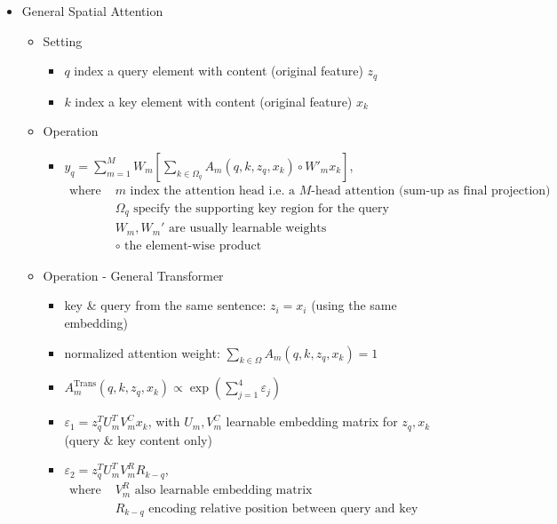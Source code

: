 \begin{itemize}
\item General Spatial Attention
	\begin{itemize}
	\item Setting
		\begin{itemize}
		\item $q$ index a query element with content (original feature) $z_q$
		\item $k$ index a key element with content (original feature) $x_k$
		\end{itemize}
	\item Operation
		\begin{itemize}
		\item $\displaystyle y_q=\sum_{m=1}^M W_m [ \sum_{k\in\Omega_q} A_m(q, k, z_q, x_k) \circ W'_m x_k ]$, \\
		$\begin{alignedat}{1}
		\text{where } & m \text{ index the attention head i.e. a } M\text{-head attention (sum-up as final projection)} \\
		& \Omega_q \text{ specify the supporting key region for the query} \\
		& W_m, W_m' \text{ are usually learnable weights} \\
		& \circ \text{ the element-wise product}
		\end{alignedat}$
		\end{itemize}
	\item Operation - General Transformer
		\begin{itemize}
		\item key \& query from the same sentence: $z_i=x_i$ (using the same embedding)
		\item normalized attention weight: $\sum_{k\in\Omega}A_m(q, k, z_q, x_k)=1$
		\item $A_m^\text{Trans}(q, k, z_q, x_k) \propto \exp(\sum_{j=1}^4 \varepsilon_j)$
		\item $\varepsilon_1 = z_q^T U_m^T V_m^C x_k$, with $U_m,V_m^C$ learnable embedding matrix for $z_q, x_k$ \\
		(query \& key content only)
		\item $\varepsilon_2 = z_q^TU_m^TV_m^R R_{k-q}$, \\ 
		$\begin{alignedat}{1} \text{where } & V_m^R \text{ also learnable embedding matrix} \\
		& R_{k-q} \text{ encoding relative position between query and key (positional embedding)}
		\end{alignedat}$ \\

\end{itemize}
\end{itemize}
\end{itemize}
